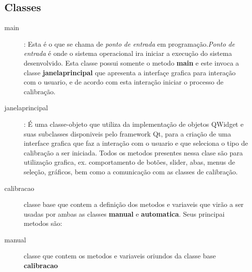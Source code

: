 \subsection{Classes}
	\begin{description}

	\item [main]: Esta é o que se chama de \textit{ponto de entrada} em programação.\textit{Ponto de entrada} é onde o sistema operacional ira iniciar a execução do sistema desenvolvido. Esta classe possui somente o metodo \textbf{main} e este invoca a classe \textbf{janelaprincipal} que apresenta a interfaçe grafica para interação com o usuario, e de acordo com esta interação iniciar o processo de calibração.
	
	\item [janelaprincipal]: É uma classe-objeto que utiliza da implementação de objetos QWidget e suas subclasses disponiveis pelo framework Qt, para a criação de uma interface grafica que faz a interação com o usuario e que seleciona o tipo de calibração a ser iniciada. Todos os metodos presentes nessa clase são para utilização grafica, ex. comportamento de botões, slider, abas, menus de seleção, gráficos, bem como a comunicação com as classes de calibração.	
		
	\item [calibracao] classe base que contem a definição dos metodos e variaveis que virão a ser usadas por ambas as classes \textbf{manual} e \textbf{automatica}. Seus principai metodos são:
	
	\item [manual] classe que contem os metodos e variaveis oriundos da classe base \textbf{calibracao} 
	

\end{description}
